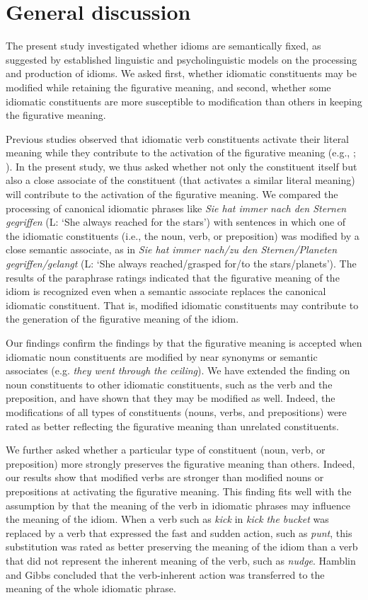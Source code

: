 \documentclass[output=paper]{langsci/langscibook}
\begin{document}
\section{General discussion}
The present study investigated whether idioms are semantically fixed, as suggested by established linguistic and psycholinguistic models on the processing and production of idioms. We asked first, whether idiomatic constituents may be modified while retaining the figurative meaning, and second, whether some idiomatic constituents are more susceptible to modification than others in keeping the figurative meaning. 

Previous studies observed that idiomatic verb constituents activate their literal meaning while they contribute to the activation of the figurative meaning (e.g., \citealt{rabanus:2008}; \citealt{smolka:2007}). In the present study, we thus asked whether not only the constituent itself but also a close associate of the constituent (that activates a similar literal meaning) will contribute to the activation of the figurative meaning. We compared the processing of canonical idiomatic phrases like \textit{Sie hat immer nach den Sternen gegriffen} (L: ‘She always reached for the stars’) with sentences in which one of the idiomatic constituents (i.e., the noun, verb, or preposition) was modified by a close semantic associate, as in \textit{Sie hat immer nach/zu den Sternen/Planeten gegriffen/gelangt} (L: ‘She always reached/grasped for/to the stars/planets’). The results of the paraphrase ratings indicated that the figurative meaning of the idiom is recognized even when a semantic associate replaces the canonical idiomatic constituent. That is, modified idiomatic constituents may contribute to the generation of the figurative meaning of the idiom. 

Our findings confirm the findings by \citet{geeraert:2017} that the figurative meaning is accepted when idiomatic noun constituents are modified by near synonyms or semantic associates (e.g. \textit{they went through the ceiling}).  We have extended the finding on noun constituents to other idiomatic constituents, such as the verb and the preposition, and have shown that they may be modified as well. Indeed, the modifications of all types of constituents (nouns, verbs, and prepositions) were rated as better reflecting the figurative meaning than unrelated constituents. 

We further asked whether a particular type of constituent (noun, verb, or preposition) more strongly preserves the figurative meaning than others.  Indeed, our results show that modified verbs are stronger than modified nouns or prepositions at activating the figurative meaning. This finding fits well with the assumption by \citet{hamblin:1999} that the meaning of the verb in idiomatic phrases may influence the meaning of the idiom. When a verb such as \textit{kick} in \textit{kick the bucket} was replaced by a verb that expressed the fast and sudden action, such as \textit{punt}, this substitution was rated as better preserving the meaning of the idiom than a verb that did not represent the inherent meaning of the verb, such as \textit{nudge}. Hamblin and Gibbs concluded that the verb-inherent action was transferred to the meaning of the whole idiomatic phrase.
\end{document}
